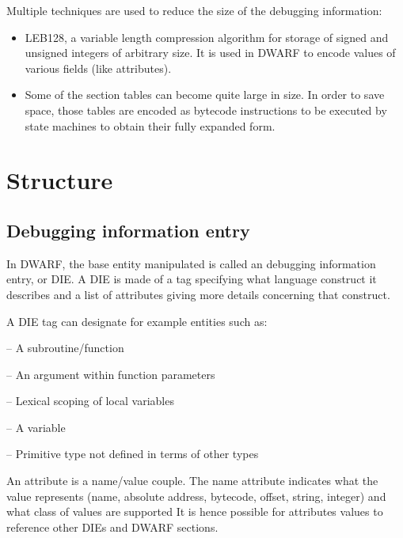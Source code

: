 Multiple techniques are used to reduce the size of the debugging information:

\begin{itemize}
    \item LEB128, a variable length compression algorithm for storage of
        signed and unsigned integers of arbitrary size.
        It is used in DWARF to encode values of various fields (like attributes).
    \item Some of the section tables can become quite large in size.
        In order to save space, those tables are encoded as bytecode instructions
        to be executed by state machines to obtain their fully expanded form.
\end{itemize}

\section{Structure}

\subsection{Debugging information entry}

In DWARF, the base entity manipulated is called an debugging information entry, or DIE.
A DIE is made of a tag specifying what language construct it describes and a list of attributes giving more details concerning that construct.

A DIE tag can designate for example entities such as:
\begin{description}[labelwidth=\widthof{\bfseries DW\_TAG\_formal\_parameter},align=parright]
    \item[DW\_TAG\_subprogram] -- A subroutine/function
    \item[DW\_TAG\_formal\_parameter] -- An argument within function parameters
    \item[DW\_TAG\_lexical\_block] -- Lexical scoping of local variables
    \item[DW\_TAG\_variable] -- A variable
    \item[DW\_TAG\_base\_type] -- Primitive type not defined in terms of other
        types
\end{description}

An attribute is a name/value couple.
The name attribute indicates what the value represents (name, absolute address,
bytecode, offset, string, integer) and what class of values are supported
It is hence possible for attributes values to reference other DIEs and DWARF sections.

